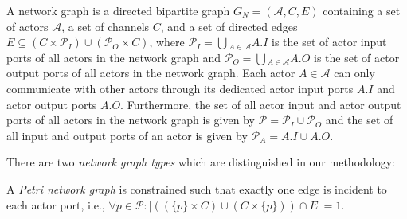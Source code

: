 \begin{definition}
A network graph is a directed bipartite graph $G_N=(\mathcal{A},C,E)$ containing
a set of actors $\mathcal{A}$, a set of channels $C$, and a set of
directed edges $E \subseteq (C \times \mathcal{P}_I)
\cup (\mathcal{P}_O \times C)$, where
$\mathcal{P}_I = \bigcup{}_{A \in \mathcal{A}} A.I$
is the set of actor input ports of all actors in the network graph and
$\mathcal{P}_O = \bigcup{}_{A \in \mathcal{A}} A.O$
is the set of actor output ports of all actors in the network graph.
Each actor $A \in \mathcal{A}$ can only communicate with other actors
through its dedicated actor input ports $A.I$ and
actor output ports $A.O$.
Furthermore, the set of all actor input and actor output ports of all actors in
the network graph is given by $\mathcal{P} = \mathcal{P}_I \cup \mathcal{P}_O$ and
the set of all input and output ports of an actor is given by $\mathcal{P}_{A} = A.I \cup A.O$.


\end{definition}

There are two \emph{network graph types} which are distinguished in our methodology:

\begin{definition}\label{petri-network-graph}
  A \emph{Petri network graph} is constrained such that exactly
  one edge is incident to each actor port,
  i.e., $\forall{p \in \mathcal{P}}: |((\{p\} \times C) \cup (C \times \{p\})) \cap E| = 1$.
\end{definition}

